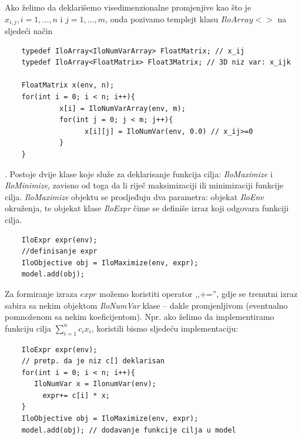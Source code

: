 \documentclass[a4paper, utf8, 11pt, colorlinks]{book}
\theoremstyle{definition}
\begin{document}
 \noindent Ako želimo da deklarišemo visedimenzionalne promjenjive kao što je $x_{i,j}, i=1,...,n$ i $j=1,...,m$, onda pozivamo templejt klasu ${IloArray}<>$ na sljedeći način
 
 \begin{verbatim}
 	typedef IloArray<IloNumVarArray> FloatMatrix; // x_ij 
 	typedef IloArray<FloatMatrix> Float3Matrix; // 3D niz var: x_ijk
 	
 	FloatMatrix x(env, n);
 	for(int i = 0; i < n; i++){
 		     x[i] = IloNumVarArray(env, m);
 		     for(int j = 0; j < m; j++){
 		  	       x[i][j] = IloNumVar(env, 0.0) // x_ij>=0
 		     }
 	}
 \end{verbatim}
 
 . 
 Postoje dvije klase koje služe za deklarisanje funkcija cilja: \emph{IloMaximize} i \emph{IloMinimize}, zavisno od toga da li riječ maksimizaciji ili minimizaciji funkcije cilja.  \emph{IloMaximize} objektu se prosljeđuju dva parametra: objekat \emph{IloEnv} okruženja, te objekat klase \emph{IloExpr} čime se definiše  izraz koji odgovara funkciji cilja. 
 
 \begin{verbatim}
 	IloExpr expr(env);
 	//definisanje expr
 	IloObjective obj = IloMaximize(env, expr);
 	model.add(obj);
 \end{verbatim}
 
 \noindent Za formiranje izraza $expr$ možemo koristiti operator  ,,+='', gdje se trenutni izraz sabira sa nekim objektom \emph{IloNumVar} klase -- dakle promjenljivom (eventualno pomnoženom sa nekim koeficijentom). 
 Npr. ako želimo da implementiramo funkciju cilja $\sum_{i=1}^n c_i x_i$, koristili bismo sljedeću implementaciju:
 
 \begin{verbatim}
 	IloExpr expr(env);
 	// pretp. da je niz c[] deklarisan
 	for(int i = 0; i < n; i++){
       IloNumVar x = IlonumVar(env);
 	     expr+= c[i] * x;
 	}
 	IloObjective obj = IloMaximize(env, expr);
 	model.add(obj); // dodavanje funkcije cilja u model
 \end{verbatim}
 
\end{document}
